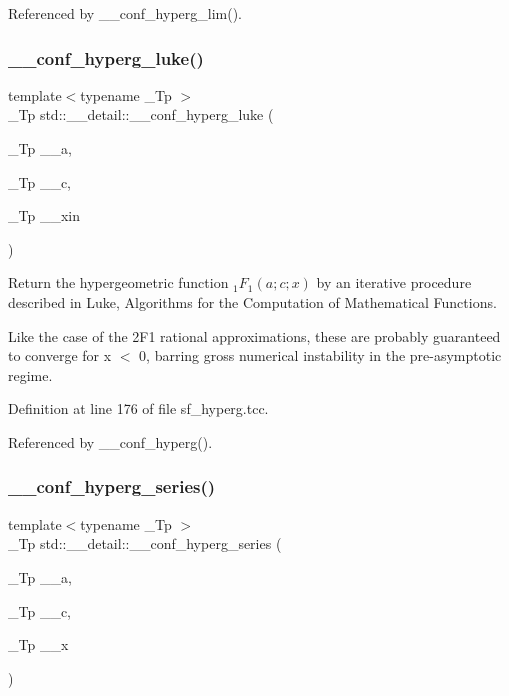 Referenced by \+\_\+\+\_\+conf\+\_\+hyperg\+\_\+lim().

\mbox{\label{namespacestd_1_1____detail_ac3b4c72998f9d7deb6d79bda93220e58}} 
\subsubsection{\texorpdfstring{\+\_\+\+\_\+conf\+\_\+hyperg\+\_\+luke()}{\_\_conf\_hyperg\_luke()}}
{\footnotesize\ttfamily template$<$typename \+\_\+\+Tp $>$ \\
\+\_\+\+Tp std\+::\+\_\+\+\_\+detail\+::\+\_\+\+\_\+conf\+\_\+hyperg\+\_\+luke (\begin{DoxyParamCaption}\item[{\+\_\+\+Tp}]{\+\_\+\+\_\+a,  }\item[{\+\_\+\+Tp}]{\+\_\+\+\_\+c,  }\item[{\+\_\+\+Tp}]{\+\_\+\+\_\+xin }\end{DoxyParamCaption})}



Return the hypergeometric function $ {}_1F_1(a;c;x) $ by an iterative procedure described in Luke, Algorithms for the Computation of Mathematical Functions. 

Like the case of the 2\+F1 rational approximations, these are probably guaranteed to converge for x $<$ 0, barring gross numerical instability in the pre-\/asymptotic regime. 

Definition at line 176 of file sf\+\_\+hyperg.\+tcc.



Referenced by \+\_\+\+\_\+conf\+\_\+hyperg().

\mbox{\label{namespacestd_1_1____detail_a5f701a63e17238132405dd209660fc1d}} 
\subsubsection{\texorpdfstring{\+\_\+\+\_\+conf\+\_\+hyperg\+\_\+series()}{\_\_conf\_hyperg\_series()}}
{\footnotesize\ttfamily template$<$typename \+\_\+\+Tp $>$ \\
\+\_\+\+Tp std\+::\+\_\+\+\_\+detail\+::\+\_\+\+\_\+conf\+\_\+hyperg\+\_\+series (\begin{DoxyParamCaption}\item[{\+\_\+\+Tp}]{\+\_\+\+\_\+a,  }\item[{\+\_\+\+Tp}]{\+\_\+\+\_\+c,  }\item[{\+\_\+\+Tp}]{\+\_\+\+\_\+x }\end{DoxyParamCaption})}



